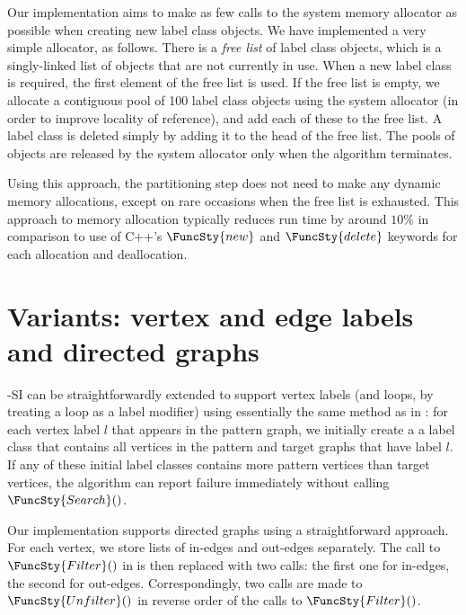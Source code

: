 Our implementation aims to make as few calls to the system memory allocator as possible when creating
new label class objects.  We have implemented a very simple allocator, as follows.  There is a \emph{free list}
of label class objects, which is a singly-linked list of objects that are not currently in use.  When
a new label class is required, the first element of the free list is used.  If the free list is empty,
we allocate a contiguous pool of 100 label class objects using the system allocator (in order to improve
locality of reference), and add each of these to the free list.  A label class is deleted simply by
adding it to the head of the free list.  The pools of objects are released by the system allocator only when
the algorithm terminates.

Using this approach, the partitioning step does not need to make any dynamic memory allocations, except
on rare occasions when the free list is exhausted.
This approach to memory allocation typically reduces run time by around $10\%$ in comparison to use of
C++'s $\FuncSty{new}$ and $\FuncSty{delete}$ keywords for each allocation and deallocation.

\section{Variants: vertex and edge labels and directed graphs}

\McSplit-SI can be straightforwardly extended to support vertex labels (and loops, by
treating a loop as a label modifier) using essentially
the same method as in \McSplit: for each vertex label $l$ that appears in the pattern graph,
we initially create a a label class that contains all vertices in the pattern and target
graphs that have label $l$.  If any of these initial label classes contains more pattern vertices
than target vertices, the algorithm can report failure immediately without calling
$\FuncSty{Search}()$.

Our implementation supports directed graphs using a straightforward approach.  For each
vertex, we store lists of in-edges and out-edges separately.  The call to $\FuncSty{Filter}()$
in  is then replaced with two calls: the first one for in-edges, the second
for out-edges.  Correspondingly, two calls are made to $\FuncSty{Unfilter}()$ in reverse
order of the calls to $\FuncSty{Filter}()$.

